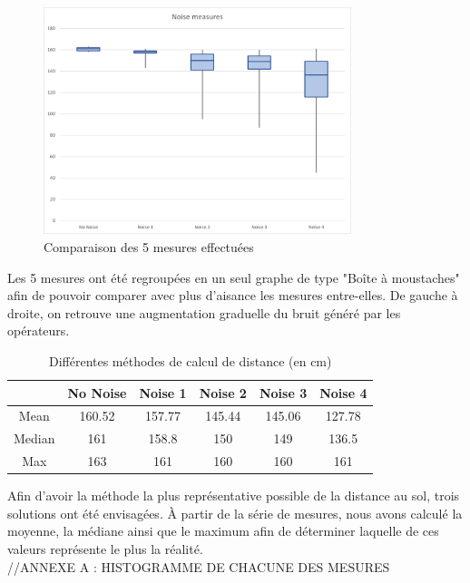 \begin{figure}[H]
    \centering
    \includegraphics[width=0.8\textwidth]{Images/LiDAR/LiDAR_ErrorMes_Moustache.png}
    \caption{Comparaison des 5 mesures effectuées}
    \label{fig:ErrorMesMoustache}
\end{figure}

Les 5 mesures ont été regroupées en un seul graphe de type "Boîte à moustaches" afin de pouvoir
comparer avec plus d'aisance les mesures entre-elles. De gauche à droite, on retrouve une augmentation
graduelle du bruit généré par les opérateurs.

\begin{table}[H]
    \centering
    \begin{tabular}{|c|c|c|c|c|c|}
        \hline
        & No Noise & Noise 1 & Noise 2 & Noise 3 & Noise 4 \\
        \hline\hline
        Mean & 160.52 & 157.77 & 145.44 & 145.06 & 127.78 \\
        \hline
        Median & 161 & 158.8 & 150 & 149 & 136.5 \\
        \hline
        Max & 163 & 161 & 160 & 160 & 161 \\
        \hline
        
    \end{tabular}
    \caption{Différentes méthodes de calcul de distance (en cm)}
    \label{table:ComputingMethods}
\end{table}

Afin d'avoir la méthode la plus représentative possible de la distance au sol, trois solutions 
ont été envisagées. À partir de la série de mesures, nous avons calculé la moyenne, la médiane
ainsi que le maximum afin de déterminer laquelle de ces valeurs représente le plus la réalité.\\
//ANNEXE A : HISTOGRAMME DE CHACUNE DES MESURES

